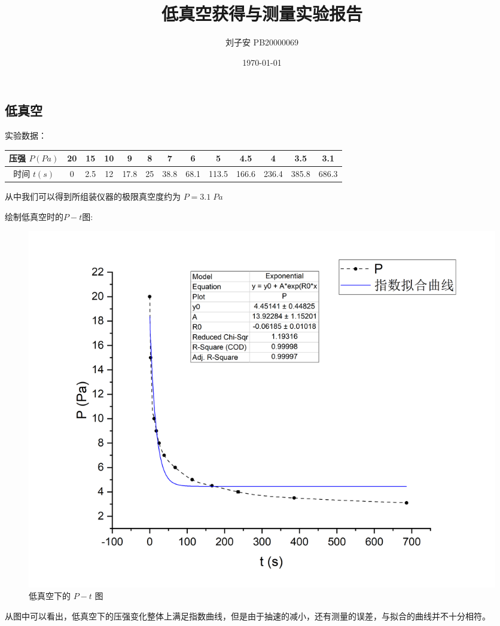 \documentclass[UTF8]{ctexart}
\title{低真空获得与测量实验报告}
\author{刘子安 PB20000069}
\date{\today}
\begin{document}
\maketitle

\subsection{低真空}
实验数据：
\begin{table}[!htbp]
	\centering
\begin{tabular}{|c|c|c|c|c|c|c|c|c|c|c|c|c|}
	\hline
	压强 $P(Pa)$ & 20 & 15 & 10 & 9 & 8 & 7 & 6 & 5 & 4.5 & 4 & 3.5 & 3.1 \\
	\hline
	时间 $t(s)$ & 0 & 2.5 & 12 & 17.8 & 25 & 38.8 & 68.1 & 113.5 & 166.6 & 236.4 & 385.8 & 686.3 \\
	\hline
\end{tabular}
\end{table}
\par
从中我们可以得到所组装仪器的极限真空度约为 $P = 3.1 \; Pa$
\par
绘制低真空时的$P-t$图:
\begin{figure}[htb]
	\centering
	\includegraphics[scale=0.45]{Graph2.png}
	\caption{低真空下的 $P-t$ 图}
\end{figure}
\par
从图中可以看出，低真空下的压强变化整体上满足指数曲线，但是由于抽速的减小，还有测量的误差，与拟合的曲线并不十分相符。
\end{document}
